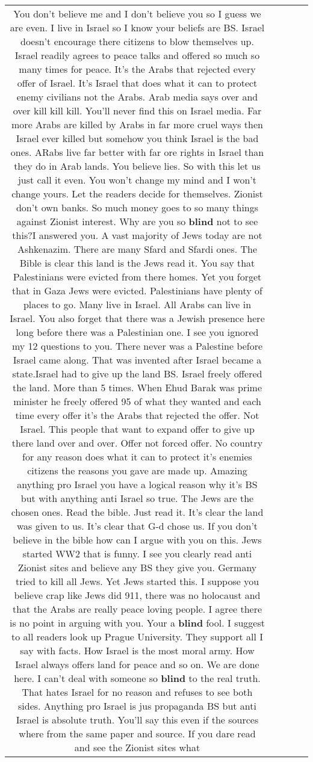 \documentclass[11pt]{article}
\newlength\mylength
\begin{document}
\begin{center}
\begin{longtable}{|C{.65\mylength}|C{.30\mylength}|C{.12\mylength}|C{.12\mylength}|C{.12\mylength}|}
  \small You don't believe me and I don't believe you so I guess we are even. I live in Israel so I know your beliefs are BS. Israel doesn't encourage there citizens to blow themselves up.  Israel readily agrees to peace talks and offered so much so many times for peace. It's the Arabs that rejected every offer of Israel. It's Israel that does  what it can to protect enemy civilians not the Arabs.  Arab media says over and over kill kill kill. You'll never find this on Israel media. Far more Arabs are killed by Arabs in far more cruel ways then Israel ever killed but somehow you think Israel is the bad ones.  ARabs live far better with far ore rights in Israel than they do in Arab lands.  You believe lies. So with this let us just call it even. You won't change my mind and I won't change yours. Let the readers decide for themselves. Zionist don't own banks. So much money goes to so many things against Zionist interest. Why are you so \textbf{blind} not to see this?I answered you.  A vast majority of Jews today are not Ashkenazim. There are many Sfard and Sfardi ones. The  Bible is clear this land is the Jews read it.  You say that Palestinians were evicted from there homes. Yet you forget that in Gaza Jews were evicted. Palestinians have plenty of places to go. Many live in Israel. All Arabs can live in Israel. You also forget that there was a Jewish presence here long before there was a Palestinian one. I see you ignored my 12 questions to you. There never was a Palestine before Israel came along. That was invented after Israel became a state.Israel had to give up the land BS. Israel freely offered the land. More than 5 times. When Ehud Barak was prime minister he freely offered 95 of what they wanted and each time every offer it's the Arabs that rejected the offer. Not  Israel. This people that want to expand offer to give up there land over and over. Offer not forced offer. No country for any reason does what it can to protect it's enemies citizens the reasons you gave are made up.  Amazing anything pro Israel you have a logical reason why it's BS but with anything anti Israel so true. The Jews are the chosen ones. Read the bible. Just read it. It's clear the land was given to us. It's clear that G-d chose us. If you don't believe in the bible how can I argue with you on this. Jews started WW2 that is funny. I see you clearly read anti Zionist sites and believe any BS they give you. Germany tried to kill all Jews. Yet Jews started this. I suppose you believe crap like Jews did 911, there was no holocaust and that the Arabs are really peace loving people.   I agree there is no point in arguing with you. Your a \textbf{blind} fool. I suggest to all readers look up Prague University. They support all I say with facts. How Israel is the most moral army.  How Israel always offers land for peace and so on. We are done here. I can't deal with someone so \textbf{blind} to the real truth. That hates Israel for no reason and refuses to see both sides. Anything pro Israel is jus propaganda BS but anti Israel is absolute truth. You'll say this even if the sources where from the same paper and source. If you dare read and see the Zionist sites what 
\end{longtable}
\end{center}
\end{document}

